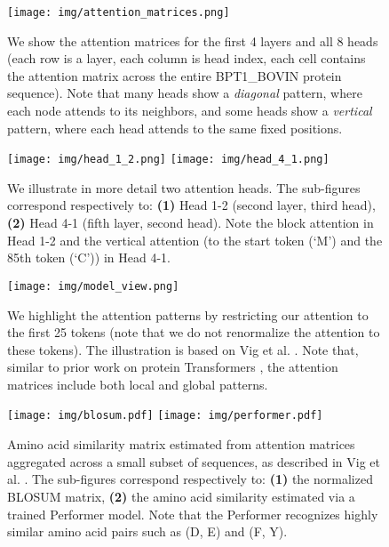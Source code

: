 \begin{figure}[h]
  \centering
  \texttt{[image: img/attention\_matrices.png]}
  \vspace{2mm}
  \caption{\small{We show the attention matrices for the first 4 layers and all 8 heads (each row is a layer, each column is head index, each cell contains the attention matrix across the entire BPT1\_BOVIN protein sequence). Note that many heads show a \textit{diagonal} pattern, where each node attends to its neighbors, and some heads show a \textit{vertical} pattern, where each head attends to the same fixed positions.}}
  \label{fig:attention_matrices}
\end{figure}

\begin{figure}[h]
  \centering
  \texttt{[image: img/head\_1\_2.png]}
  \texttt{[image: img/head\_4\_1.png]}
  \vspace{2mm}
  \caption{\small{We illustrate in more detail two attention heads. The sub-figures correspond respectively to: \textbf{(1)} Head 1-2 (second layer, third head), \textbf{(2)} Head 4-1 (fifth layer, second head). Note the block attention in Head 1-2 and the vertical attention (to the start token (`M') and the 85th token (`C')) in Head 4-1.}}
  \label{fig:attention_heads}
\end{figure}

\newpage

\begin{figure}[ht]
    \centering
  \texttt{[image: img/model\_view.png]}
  \vspace{2mm}
  \caption{\small{We highlight the attention patterns by restricting our attention to the first 25 tokens (note that we do not renormalize the attention to these tokens). The illustration is based on Vig et al. \protect\citep{vig2019multiscale, analyzing_attention}. Note that, similar to prior work on protein Transformers \protect\citep{progen}, the attention matrices include both local and global patterns.}}
  \label{fig:model_view}
\end{figure}

\begin{figure}[ht]
  \centering
  \texttt{[image: img/blosum.pdf]}
  \texttt{[image: img/performer.pdf]}
  \vspace{1mm}
  \caption{\small{Amino acid similarity matrix estimated from attention matrices aggregated across a small subset of sequences, as described in Vig et al. \protect\citep{bertology}. The sub-figures correspond respectively to: \textbf{(1)} the normalized BLOSUM matrix, \textbf{(2)} the amino acid similarity estimated via a trained Performer model. Note that the Performer recognizes highly similar amino acid pairs such as (D, E) and (F, Y).}}
  \label{figure:amino-acid-similarity}
\end{figure}

